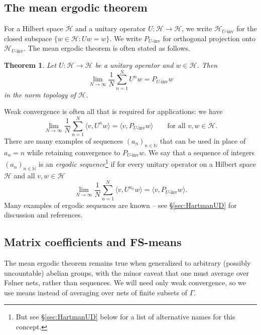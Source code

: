 \documentclass[12pt]{amsart} \usepackage{amsmath,centernot,amssymb,leftindex}
\newtheorem{theorem}{Theorem}
\numberwithin{theorem}{section}
\numberwithin{equation}{section}
\theoremstyle{definition}
\begin{document}
	
\subsection{The mean ergodic theorem}

For a Hilbert space $\mathcal H$ and a unitary operator $U:\mathcal H\to \mathcal H$, we write $\mathcal H_{U\text{-inv}}$ for the closed subspace $\{w\in \mathcal H: Uw=w\}$. We write $P_{U\text{-inv}}$ for orthogonal projection onto $\mathcal H_{U\text{-inv}}$. The mean ergodic theorem is often stated as follows.
\begin{theorem}\label{th:MeanErgodic}
	Let $U:\mathcal H\to \mathcal H$ be a unitary operator and $w\in \mathcal H$.  Then 
\[	\lim_{N\to\infty} \frac{1}{N}\sum_{n=1}^{N} U^{n} w = P_{U\text{-inv}}w\] in the norm topology of $\mathcal H$.
\end{theorem}
Weak convergence is often all that is required for applications: we have
\[
\lim_{N\to\infty} \frac{1}{N}\sum_{n=1}^{N} \langle v,U^{n}w\rangle=\langle v, P_{U\text{-inv}}w\rangle \qquad \text{for all } v, w\in \mathcal H.
\] 
There are many examples of sequences $(a_{n})_{n\in \mathbb N}$ that can be used in place of $a_{n}=n$ while retaining convergence to $P_{U\text{-inv}}w$.  We say that a sequence of integers $(a_{n})_{n\in \mathbb N}$ is an \emph{ergodic sequence}\footnote{But see \S\ref{sec:HartmanUD} below for a list of alternative names for this concept.} if for every unitary operator on a Hilbert space $\mathcal H$ and all $v, w\in \mathcal H$
\[
\lim_{N\to\infty} \frac{1}{N}\sum_{n=1}^{N} \langle v ,U^{a_{n}}w\rangle = \langle v, P_{U\text{-inv}} w\rangle.
\]
Many examples of ergodic sequences are known -- see \S\ref{sec:HartmanUD} for  discussion and references.

\subsection{Matrix coefficients and FS-means}\label{sec:FSmeans} The mean ergodic theorem remains true when generalized to arbitrary (possibly uncountable) abelian groups, with the minor caveat that one must average over F{\o}lner nets, rather than sequences.  We will need only weak convergence, so we use means instead of averaging over nets of finite subsets of $\Gamma$.
\end{document}
